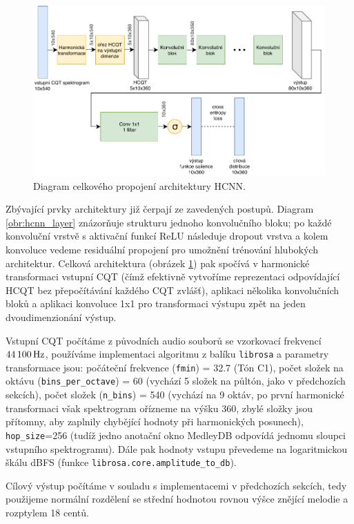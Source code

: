 \begin{figure}[h]\centering
    \includegraphics[width=\textwidth,height=\textheight,keepaspectratio]{../img/hcnn_arch}
\caption{Diagram celkového propojení architektury HCNN.}\label{obr:hcnn_arch}
\end{figure}

Zbývající prvky architektury již čerpají ze zavedených postupů. Diagram \ref{obr:hcnn_layer} znázorňuje strukturu jednoho konvolučního bloku; po každé konvoluční vrstvě s aktivační funkcí ReLU následuje dropout vrstva a kolem konvoluce vedeme residuální propojení pro umožnění trénování hlubokých architektur. Celková architektura (obrázek \ref{obr:hcnn_arch}) pak spočívá v harmonické transformaci vstupní CQT (čímž efektivně vytvoříme reprezentaci odpovídající HCQT bez přepočítávání každého CQT zvlášť), aplikaci několika konvolučních bloků a aplikaci konvoluce 1x1 pro transformaci výstupu zpět na jeden dvoudimenzionání výstup.

Vstupní CQT počítáme z původních audio souborů se vzorkovací frekvencí $44\,100\,\rm Hz$, používáme implementaci algoritmu z balíku \texttt{librosa} a parametry transformace jsou: počáteční frekvence (\texttt{fmin}) = 32.7 (Tón C1), počet složek na oktávu (\texttt{bins\_per\_octave}) = 60 (vychází 5 složek na půltón, jako v předchozích sekcích), počet složek (\texttt{n\_bins}) = 540 (vychází na 9 oktáv, po první harmonické transformaci však spektrogram ořízneme na výšku 360, zbylé složky jsou přítomny, aby zaplnily chybějící hodnoty při harmonických posunech), \texttt{hop\_size}=256 (tudíž jedno anotační okno MedleyDB odpovídá jednomu sloupci vstupního spektrogramu). Dále pak hodnoty vstupu převedeme na logaritmickou škálu dBFS (funkce \texttt{librosa.core.amplitude\_to\_db}).

Cílový výstup počítáme v souladu s implementacemi v předchozích sekcích, tedy použijeme normální rozdělení se střední hodnotou rovnou výšce znějící melodie a rozptylem 18 centů.

